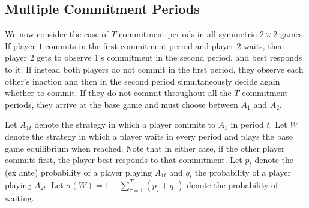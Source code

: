 \documentclass[letterpaper]{article}
\newtheorem{corollary}{Corollary}
\theoremstyle{definition}
\begin{document}

\subsection{Multiple Commitment Periods}\label{sec:multiple-commitment-periods}
We now consider the case of $T$ commitment periods in all symmetric $2\times2$ games. If player $1$ commits in the first commitment period and player $2$ waits, then player $2$ gets to observe $1$'s commitment in the second period, and best responds to it.
If instead both players do not commit in the first period, they observe each other's inaction and then in the second period simultaneously decide again whether to commit. If they do not commit throughout all the $T$ commitment periods, they arrive at the base game and must choose between $A_1$ and $A_2$.

Let $A_{1t}$ denote the strategy in which a player commits to $A_1$ in period $t$. Let $W$ denote the strategy in which a player waits in every period and plays the base game equilibrium when reached. Note that in either case, if the other player commits first, the player best responds to that commitment.
Let $p_{t}$ denote the (ex ante) probability of a player playing $A_{1t}$ and $q_t$ the probability of a player playing $A_{2t}$. Let $\sigma(W)=1-\sum_{\tau=1}^{T}(p_\tau+q_\tau)$ denote the probability of waiting.
\end{document}
